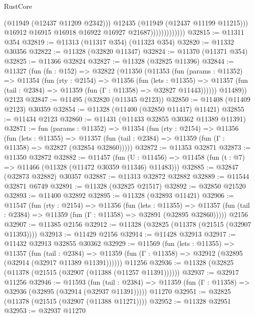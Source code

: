 \begin{lexlean}{RustCore}
\begin{coremodule}
                                  (@11949 (@12437 @11209 @2342)))
                                @12435
                                (@11949 (@12437 @11199 @11215)))
                              @16912
                              @16915
                              @16918
                              @16922
                              @16927
                              @21687)))))))))))))
@32815 := @11311 @354
@32819 := @11313 (@11317 @354) (@11323 @354)
@32820 := @11332 @30356
@32822 := @11328 (@32820 @11347)
@32824 := @11370 (@11371 @354)
@32825 := @11366 @32824
@32827 := @11328 (@32825 @11396)
@32844 := @11327
    (fun (fn : @152) =>
    @32822
      (@11350
        (@11353
          (fun (params : @11352) =>
          @11354
            (fun (rty : @2154) =>
            @11356
              (fun (lets : @11355) =>
              @11357 (fun (tail : @2384) => @11359 (fun (Γ : @11358) => @32827 @11443))))))
        @11489))
    @2123
@32847 := @11495 (@32820 (@11345 @2123))
@32850 := @11408 (@11409 @2123) @30359
@32854 := @11328 (@11400 (@32850 @11417) @11421)
@32855 := @11434 @2123
@32860 := @11431 (@11433 @32855 @30362 @11389 @11391)
@32871 := fun (params : @11352) =>
  @11354
    (fun (rty : @2154) =>
    @11356
      (fun (lets : @11355) =>
      @11357 (fun (tail : @2384) => @11359 (fun (Γ : @11358) => @32827 (@32854 @32860)))))
@32872 := @11353 @32871
@32873 := @11350 @32872
@32882 := @11457
    (fun (U : @11456) => @11458 (fun (t : @7) => @11466 (@11328 (@11472 @30359 @11346) @11483)))
@32885 := @32847 (@32873 @32882) @30357
@32887 := @11313 @32872 @32882
@32889 := @11544 @32871 @6749
@32891 := @11328 (@32825 @21517)
@32892 := @32850 @21520
@32893 := @11400 @32892
@32895 := @11328 (@32893 @11421)
@32906 := @11547
    (fun (rty : @2154) =>
    @11356
      (fun (lets : @11355) =>
      @11357 (fun (tail : @2384) => @11359 (fun (Γ : @11358) => @32891 (@32895 @32860)))))
    @2156
@32907 := @11385 @2156
@32912 := @11328 (@32825 (@11378 (@21515 (@32907 @11393))))
@32913 := @11429 @2156
@32914 := @11428 @32913
@32917 := @11432 @32913 @32855 @30362
@32929 := @11569
    (fun (lets : @11355) =>
    @11357
      (fun (tail : @2384) =>
      @11359 (fun (Γ : @11358) => @32912 (@32895 (@32914 (@32917 @11389 @11391))))))
    @11256
@32936 := @11328 (@32825 (@11378 (@21515 (@32907 (@11388 (@11257 @11391))))))
@32937 := @32917 @11256
@32946 := @11593
    (fun (tail : @2384) => @11359 (fun (Γ : @11358) => @32936 (@32895 (@32914 (@32937 @11391)))))
    @11270
@32951 := @32825 (@11378 (@21515 (@32907 (@11388 @11271))))
@32952 := @11328 @32951
@32953 := @32937 @11270

\end{coremodule}
\end{lexlean}
